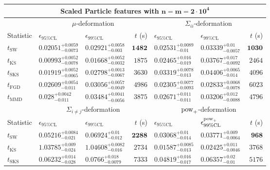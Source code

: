 \begin{tabular}{l|llr|llr}
	\toprule
	\multicolumn{7}{c}{{\bf Scaled Particle features with $\mathbf{n=m=2\cdot 10^{4}}$}} \\
	\toprule
	\multicolumn{1}{c}{} & \multicolumn{3}{c}{$\mu$-deformation} & \multicolumn{3}{c}{$\Sigma_{ii}$-deformation} \\
	Statistic & $\epsilon_{95\%\mathrm{CL}}$ & $\epsilon_{99\%\mathrm    {CL}}$ & $t$ (s) & $\epsilon_{95\%\mathrm{CL}}$ & $\epsilon_{99\%\mathrm{CL}}$ & $t$ (s) \\
	\midrule
	$t_{\mathrm{SW}}$ & $0.02051_{-0.0073}^{+0.0059}$ & $0.02921_{-0.003}^{+0.0058}$ & ${\mathbf{1482}}$ & $0.02531_{-0.01}^{+0.0089}$ & $0.03339_{-0.0057}^{+0.01}$ & ${\mathbf{1030}}$ \\
	$t_{\overline{\mathrm{KS}}}$ & ${\mathbf{0.00993_{-0.0078}^{+0.0052}}}$ & ${\mathbf{0.01668_{-0.0032}^{+0.0052}}}$ & $1875$ & $0.02465_{-0.019}^{+0.016}$ & $0.03767_{-0.0092}^{+0.017}$ & $2464$ \\
	$t_{\mathrm{SKS}}$ & $0.01919_{-0.0065}^{+0.0052}$ & $0.02798_{-0.0067}^{+0.0013}$ & $3630$ & $0.03319_{-0.013}^{+0.0078}$ & $0.04406_{-0.014}^{+0.0065}$ & $4096$ \\
	$t_{\mathrm{FGD}}$ & $0.02609_{-0.011}^{+0.0054}$ & $0.03056_{-0.0049}^{+0.0057}$ & $4986$ & ${\mathbf{0.02305_{-0.0093}^{+0.0077}}}$ & ${\mathbf{0.02833_{-0.0078}^{+0.0068}}}$ & $6023$ \\
	$t_{\mathrm{MMD}}$ & $0.028_{-0.011}^{+0.0042}$ & $0.03484_{-0.0056}^{+0.0041}$ & $3875$ & $0.02671_{-0.011}^{+0.011}$ & $0.03206_{-0.0088}^{+0.012}$ & $4796$ \\
	\toprule
	\multicolumn{1}{c}{} & \multicolumn{3}{c}{$\Sigma_{i\neq j}$-deformation} & \multicolumn{3}{c}{$\rm{pow}_{+}$-deformation} \\
	Statistic & $\epsilon_{95\%\mathrm{CL}}$ & $\epsilon_{99\%\mathrm{CL}}$ & $t$ (s) & $\epsilon_{95\%\mathrm{CL}}$ & $\epsilon^{\rm   {pow}_{+}}_{99\%\mathrm{CL}}$ & $t$ (s) \\
	\midrule
	$t_{\mathrm{SW}}$ & $0.05216_{-0.021}^{+0.0084}$ & $0.06924_{-0.012}^{+0.01}$ & ${\mathbf{2288}}$ & $0.03068_{-0.014}^{+0.01}$ & $0.03771_{-0.0064}^{+0.009}$ & ${\mathbf{968}}$ \\
	$t_{\overline{\mathrm{KS}}}$ & $1.03785_{-0.024}^{+0.009}$ & $1.04608_{-0.016}^{+0.0082}$ & $2734$ & ${\mathbf{0.01587_{-0.013}^{+0.0085}}}$ & ${\mathbf{0.02425_{-0.0046}^{+0.011}}}$ & $3768$ \\
	$t_{\mathrm{SKS}}$ & $0.06232_{-0.028}^{+0.014}$ & $0.0766_{-0.0079}^{+0.018}$ & $7333$ & $0.04819_{-0.017}^{+0.016}$ & $0.06357_{-0.01}^{+0.02}$ & $5176$ \\

\end{tabular}
